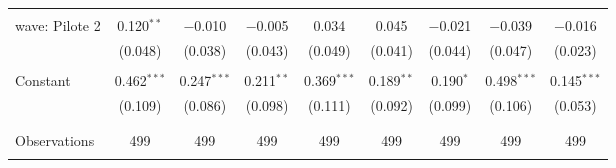 \begin{tabular}{@{\extracolsep{5pt}}lcccccccc}
  & & & & & & & & \\ 
 wave: Pilote 2 & 0.120$^{**}$ & $-$0.010 & $-$0.005 & 0.034 & 0.045 & $-$0.021 & $-$0.039 & $-$0.016 \\ 
  & (0.048) & (0.038) & (0.043) & (0.049) & (0.041) & (0.044) & (0.047) & (0.023) \\ 
  & & & & & & & & \\ 
 Constant & 0.462$^{***}$ & 0.247$^{***}$ & 0.211$^{**}$ & 0.369$^{***}$ & 0.189$^{**}$ & 0.190$^{*}$ & 0.498$^{***}$ & 0.145$^{***}$ \\ 
  & (0.109) & (0.086) & (0.098) & (0.111) & (0.092) & (0.099) & (0.106) & (0.053) \\ 
  & & & & & & & & \\ 
\hline \\[-1.8ex] 

Observations & 499 & 499 & 499 & 499 & 499 & 499 & 499 & 499 \\ 
\hline 
\hline \\[-1.8ex] 
\end{tabular} 
